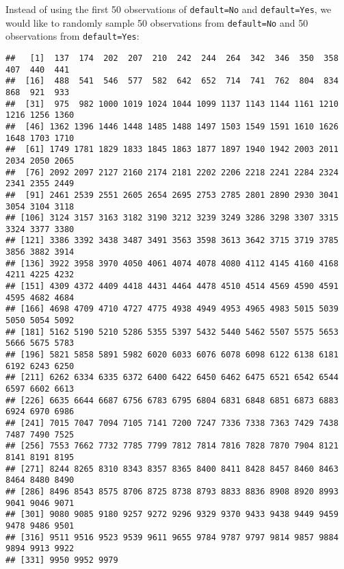 \documentclass[
]{article}
\newenvironment{Shaded}{\begin{snugshade}}{\end{snugshade}}
\newcommand{\CommentTok}[1]{\textcolor[rgb]{0.56,0.35,0.01}{\textit{#1}}}
\newcommand{\DecValTok}[1]{\textcolor[rgb]{0.00,0.00,0.81}{#1}}
\newcommand{\FunctionTok}[1]{\textcolor[rgb]{0.00,0.00,0.00}{#1}}
\newcommand{\NormalTok}[1]{#1}
\newcommand{\OtherTok}[1]{\textcolor[rgb]{0.56,0.35,0.01}{#1}}
\newcommand{\SpecialCharTok}[1]{\textcolor[rgb]{0.00,0.00,0.00}{#1}}
\newcommand{\StringTok}[1]{\textcolor[rgb]{0.31,0.60,0.02}{#1}}
\begin{document}
Instead of using the first 50 observations of \texttt{default=No} and
\texttt{default=Yes}, we would like to randomly sample 50 observations
from \texttt{default=No} and 50 observations from \texttt{default=Yes}:

\begin{Shaded}
\end{Shaded}

\begin{verbatim}
##   [1]  137  174  202  207  210  242  244  264  342  346  350  358  407  440  441
##  [16]  488  541  546  577  582  642  652  714  741  762  804  834  868  921  933
##  [31]  975  982 1000 1019 1024 1044 1099 1137 1143 1144 1161 1210 1216 1256 1360
##  [46] 1362 1396 1446 1448 1485 1488 1497 1503 1549 1591 1610 1626 1648 1703 1710
##  [61] 1749 1781 1829 1833 1845 1863 1877 1897 1940 1942 2003 2011 2034 2050 2065
##  [76] 2092 2097 2127 2160 2174 2181 2202 2206 2218 2241 2284 2324 2341 2355 2449
##  [91] 2461 2539 2551 2605 2654 2695 2753 2785 2801 2890 2930 3041 3054 3104 3118
## [106] 3124 3157 3163 3182 3190 3212 3239 3249 3286 3298 3307 3315 3324 3377 3380
## [121] 3386 3392 3438 3487 3491 3563 3598 3613 3642 3715 3719 3785 3856 3882 3914
## [136] 3922 3958 3970 4050 4061 4074 4078 4080 4112 4145 4160 4168 4211 4225 4232
## [151] 4309 4372 4409 4418 4431 4464 4478 4510 4514 4569 4590 4591 4595 4682 4684
## [166] 4698 4709 4710 4727 4775 4938 4949 4953 4965 4983 5015 5039 5050 5054 5092
## [181] 5162 5190 5210 5286 5355 5397 5432 5440 5462 5507 5575 5653 5666 5675 5783
## [196] 5821 5858 5891 5982 6020 6033 6076 6078 6098 6122 6138 6181 6192 6243 6250
## [211] 6262 6334 6335 6372 6400 6422 6450 6462 6475 6521 6542 6544 6597 6602 6613
## [226] 6635 6644 6687 6756 6783 6795 6804 6831 6848 6851 6873 6883 6924 6970 6986
## [241] 7015 7047 7094 7105 7141 7200 7247 7336 7338 7363 7429 7438 7487 7490 7525
## [256] 7553 7662 7732 7785 7799 7812 7814 7816 7828 7870 7904 8121 8141 8191 8195
## [271] 8244 8265 8310 8343 8357 8365 8400 8411 8428 8457 8460 8463 8464 8480 8490
## [286] 8496 8543 8575 8706 8725 8738 8793 8833 8836 8908 8920 8993 9041 9046 9071
## [301] 9080 9085 9180 9257 9272 9296 9329 9370 9433 9438 9449 9459 9478 9486 9501
## [316] 9511 9516 9523 9539 9611 9655 9784 9787 9797 9814 9857 9884 9894 9913 9922
## [331] 9950 9952 9979
\end{verbatim}
\end{document}
